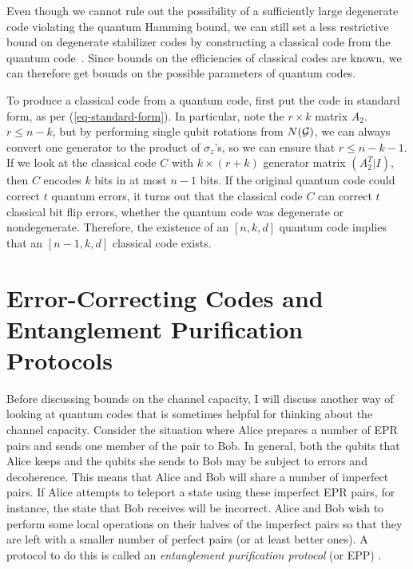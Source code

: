 \documentclass{report}
\newcommand{\G}{{\cal G}}
\newcommand{\Z}{\sigma_z}
\begin{document}
Even though we cannot rule out the possibility of a sufficiently large 
degenerate code violating the quantum Hamming bound, we can still set
a less restrictive bound on degenerate stabilizer codes by constructing
a classical code from the quantum code~\cite{cleve-classical}.  Since bounds 
on the efficiencies of classical codes are known, we can therefore get
bounds on the possible parameters of quantum codes.

To produce a classical code from a quantum code, first put the code in
standard form, as per (\ref{eq-standard-form}).  In particular, note the
$r \times k$ matrix $A_2$.  $r \leq n-k$, but by performing single qubit
rotations from $N(\G)$, we can always convert one generator to the product of 
$\Z$'s, so we can ensure that $r \leq n-k-1$.  If we look at the classical code 
$C$ with $k \times (r+k)$ generator matrix $(A_2^T | I)$, then $C$ encodes
$k$ bits in at most $n-1$ bits.  If the original quantum code could correct
$t$ quantum errors, it turns out that the classical code $C$ can correct $t$
classical bit flip errors, whether the quantum code was degenerate or 
nondegenerate.  Therefore, the existence of an $[n, k, d]$ quantum code
implies that an $[n-1, k, d]$ classical code exists.

\section{Error-Correcting Codes and Entanglement Purification Protocols}

Before discussing bounds on the channel capacity, I will discuss another 
way of looking at quantum codes that is sometimes helpful for thinking 
about the channel capacity.  Consider the situation where Alice prepares a 
number of EPR pairs and sends one member of the pair to Bob.  In general, 
both the qubits that Alice keeps and the qubits she sends to Bob may be 
subject to errors and decoherence.  This means that Alice and Bob will 
share a number of imperfect pairs.  If Alice attempts to teleport a state 
using these imperfect EPR pairs, for instance, the state that Bob receives 
will be incorrect.  Alice and Bob wish to perform some local operations on 
their halves of the imperfect pairs so that they are left with a smaller 
number of perfect pairs (or at least better ones).  A protocol to do this is 
called an {\em entanglement purification protocol} (or EPP) 
\cite{bennett-tome,bennett-EPP}.
\end{document}
